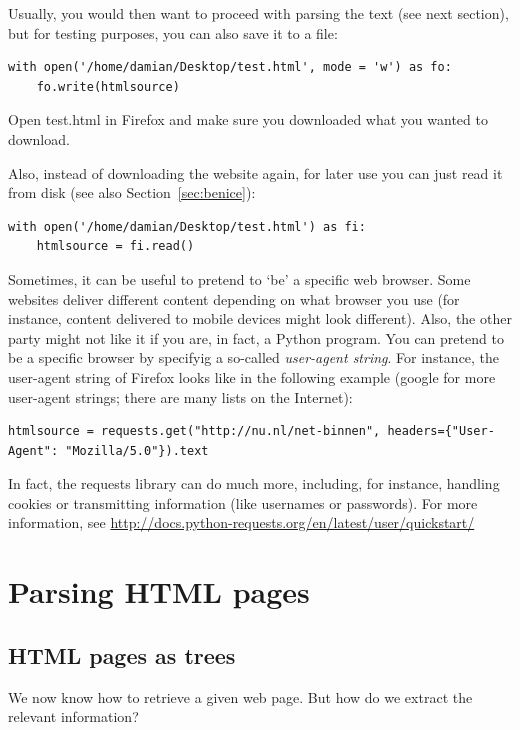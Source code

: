 \documentclass[a4paper,12pt]{book}
\begin{document}
Usually, you would then want to proceed with parsing the text (see next section), but for testing purposes, you can also save it to a file:

\begin{lstlisting}
with open('/home/damian/Desktop/test.html', mode = 'w') as fo:
    fo.write(htmlsource)
\end{lstlisting}
Open test.html in Firefox and make sure you downloaded what you wanted to download.

Also, instead of downloading the website again, for later use you can just read it from disk (see also Section~\ref{sec:benice}):

\begin{lstlisting}
with open('/home/damian/Desktop/test.html') as fi:
    htmlsource = fi.read()
\end{lstlisting}


Sometimes, it can be useful to pretend to `be' a specific web browser. Some websites deliver different content depending on what browser you use (for instance, content delivered to mobile devices might look different). Also, the other party might not like it if you are, in fact, a Python program.
You can pretend to be a specific browser by specifyig a so-called \emph{user-agent string}.
For instance, the user-agent string of Firefox looks like in the following example (google for more user-agent strings; there are many lists on the Internet):

\begin{lstlisting}
htmlsource = requests.get("http://nu.nl/net-binnen", headers={"User-Agent": "Mozilla/5.0"}).text
\end{lstlisting}

In fact, the requests library can do much more, including, for instance, handling cookies or transmitting information (like usernames or passwords). For more information, see \url{http://docs.python-requests.org/en/latest/user/quickstart/}



\section{Parsing HTML pages}
\label{parsing}
\subsection{HTML pages as trees}


We now know how to retrieve a given web page. But how do we extract the relevant information?
\end{document}
